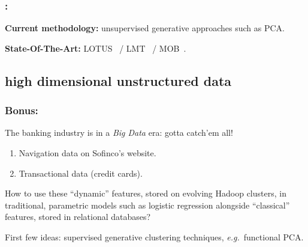 \documentclass[english,xcolor={rgb,dvipsnames,table,usenames}]{beamer}
\begin{document}
\renewcommand{\footnotesize}{\tiny}

\begin{frame}
\frametitle{\secname : \subsecname}

\textbf{Current methodology:} unsupervised generative approaches such as PCA.

\bigskip

\textbf{State-Of-The-Art:}
LOTUS~ / LMT~ / MOB~.

\bigskip

\end{frame}




\subsection{high dimensional unstructured data}

\begin{frame}
\frametitle{Bonus: \subsecname}

The banking industry is in a \textit{Big Data} era: gotta catch'em all!

\begin{enumerate}
\item Navigation data on Sofinco's website.

\item Transactional data (credit cards).

\end{enumerate}

\bigskip

How to use these ``dynamic'' features, stored on evolving Hadoop clusters, in traditional, parametric models such as logistic regression alongside  ``classical'' features, stored in relational databases?

\medskip

First few ideas: supervised generative clustering techniques, \textit{e.g.}\ functional PCA.

\end{frame}
\end{document}
